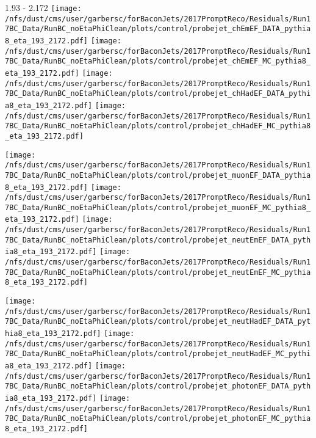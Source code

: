 \documentclass[t,compress]{beamer}
\begin{document}
\begin{frame}{1.93 - 2.172}
	\texttt{[image: /nfs/dust/cms/user/garbersc/forBaconJets/2017PromptReco/Residuals/Run17BC\_Data/RunBC\_noEtaPhiClean/plots/control/probejet\_chEmEF\_DATA\_pythia8\_eta\_193\_2172.pdf]}
	\texttt{[image: /nfs/dust/cms/user/garbersc/forBaconJets/2017PromptReco/Residuals/Run17BC\_Data/RunBC\_noEtaPhiClean/plots/control/probejet\_chEmEF\_MC\_pythia8\_eta\_193\_2172.pdf]}
	\texttt{[image: /nfs/dust/cms/user/garbersc/forBaconJets/2017PromptReco/Residuals/Run17BC\_Data/RunBC\_noEtaPhiClean/plots/control/probejet\_chHadEF\_DATA\_pythia8\_eta\_193\_2172.pdf]}
	\texttt{[image: /nfs/dust/cms/user/garbersc/forBaconJets/2017PromptReco/Residuals/Run17BC\_Data/RunBC\_noEtaPhiClean/plots/control/probejet\_chHadEF\_MC\_pythia8\_eta\_193\_2172.pdf]}
\newline

\vspace{-0.65cm}
	\texttt{[image: /nfs/dust/cms/user/garbersc/forBaconJets/2017PromptReco/Residuals/Run17BC\_Data/RunBC\_noEtaPhiClean/plots/control/probejet\_muonEF\_DATA\_pythia8\_eta\_193\_2172.pdf]}
	\texttt{[image: /nfs/dust/cms/user/garbersc/forBaconJets/2017PromptReco/Residuals/Run17BC\_Data/RunBC\_noEtaPhiClean/plots/control/probejet\_muonEF\_MC\_pythia8\_eta\_193\_2172.pdf]}
	\texttt{[image: /nfs/dust/cms/user/garbersc/forBaconJets/2017PromptReco/Residuals/Run17BC\_Data/RunBC\_noEtaPhiClean/plots/control/probejet\_neutEmEF\_DATA\_pythia8\_eta\_193\_2172.pdf]}
	\texttt{[image: /nfs/dust/cms/user/garbersc/forBaconJets/2017PromptReco/Residuals/Run17BC\_Data/RunBC\_noEtaPhiClean/plots/control/probejet\_neutEmEF\_MC\_pythia8\_eta\_193\_2172.pdf]}
\newline

\vspace{-0.65cm}
	\texttt{[image: /nfs/dust/cms/user/garbersc/forBaconJets/2017PromptReco/Residuals/Run17BC\_Data/RunBC\_noEtaPhiClean/plots/control/probejet\_neutHadEF\_DATA\_pythia8\_eta\_193\_2172.pdf]}
	\texttt{[image: /nfs/dust/cms/user/garbersc/forBaconJets/2017PromptReco/Residuals/Run17BC\_Data/RunBC\_noEtaPhiClean/plots/control/probejet\_neutHadEF\_MC\_pythia8\_eta\_193\_2172.pdf]}
	\texttt{[image: /nfs/dust/cms/user/garbersc/forBaconJets/2017PromptReco/Residuals/Run17BC\_Data/RunBC\_noEtaPhiClean/plots/control/probejet\_photonEF\_DATA\_pythia8\_eta\_193\_2172.pdf]}
	\texttt{[image: /nfs/dust/cms/user/garbersc/forBaconJets/2017PromptReco/Residuals/Run17BC\_Data/RunBC\_noEtaPhiClean/plots/control/probejet\_photonEF\_MC\_pythia8\_eta\_193\_2172.pdf]}
\end{frame}
\end{document}
